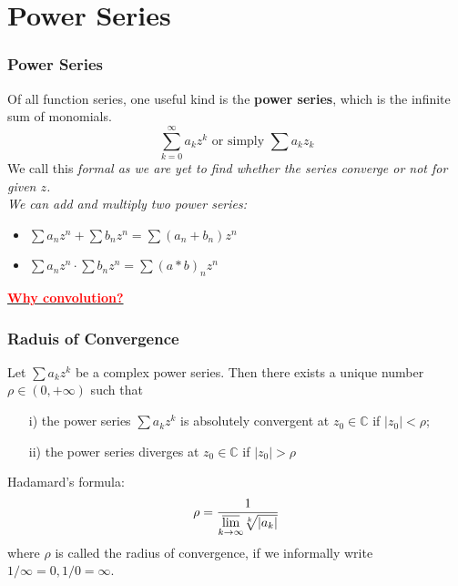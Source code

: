 \documentclass{beamer}
\newcommand{\myfont}{\rmfamily\normalsize\upshape\mdseries}
\begin{document}
\section{Power Series}
\begin{frame}
    \frametitle{Power Series}

    \hspace{1em} Of all function series, one useful kind is the \textbf{power series},
    which is the infinite sum of monomials.
    $$\sum_{k=0}^\infty a_k z^k \text{ or simply } \sum a_k z_k$$
    \hspace{1em} We call this \itshape formal \myfont as we are yet to find whether the series converge or
    not for given $z$.\\
    \vspace{1em}
    We can add and multiply two power series:
    \begin{itemize}
        \item $\sum a_n z^n +\sum b_n z^n = \sum (a_n+b_n) z^n$
        \item $\sum a_n z^n \cdot \sum b_n z^n = \sum (a*b)_n z^n$
    \end{itemize}
    \href{https://www.zhihu.com/question/54677157}{\textcolor{red}{\textbf{Why convolution?}}}
\end{frame}
\begin{frame}
    \frametitle{Raduis of Convergence}
    \hspace{1em} Let $\sum a_k z^k$ be a complex power series.
    Then there exists a unique number $\rho \in (0, +\infty)$ such that
    \begin{itemize}
        \item[i)] the power series $\sum a_k z^k$ is absolutely convergent at $z_0  \in \mathbb{C}$ if $|z_0 |<\rho$;
        \item[ii)] the power series diverges at $z_0  \in \mathbb{C}$ if $|z_0 |>\rho$
    \end{itemize}
    \vspace{1em}
    Hadamard's formula:
    $$\rho=\frac{1}{\underset{k\to \infty}{\varlimsup} \sqrt[k]{|a_k|}}$$
    where $\rho$ is called the radius of convergence, if we informally write $1/\infty = 0, 1/0 = \infty$.

\end{frame}
\end{document}

